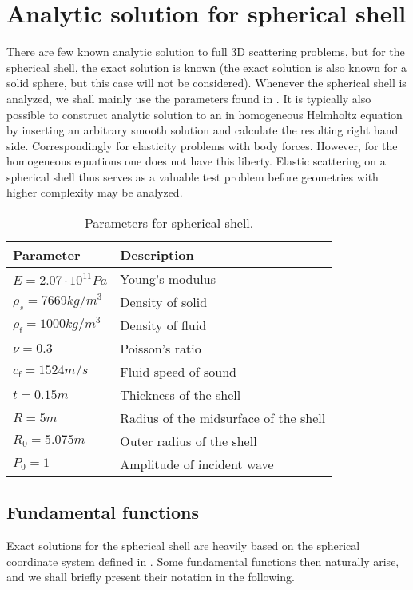 \section{Analytic solution for spherical shell}
\label{Sec2:analyticSolution}
There are few known analytic solution to full 3D scattering problems, but for the spherical shell, the exact solution is known (the exact solution is also known for a solid sphere, but this case will not be considered). Whenever the spherical shell is analyzed, we shall mainly use the parameters found in . It is typically also possible to construct analytic solution to an in homogeneous Helmholtz equation by inserting an arbitrary smooth solution and calculate the resulting right hand side. Correspondingly for elasticity problems with body forces. However, for the homogeneous equations one does not have this liberty. Elastic scattering on a spherical shell thus serves as a valuable test problem before geometries with higher complexity may be analyzed.
\begin{table}
	\centering
	\caption[Parameters for spherical shell]{Parameters for spherical shell.}
	\label{Tab2:sphericalShellParameters}
	\begin{tabular}{l l}
		\toprule
		Parameter & Description\\
		\midrule
		$E = 2.07\cdot 10^{11}\unit{Pa}$ & Young's modulus\\
		$\rho_s = 7669\unit{kg/m^3}$ & Density of solid\\
		$\rho_{\mathrm{f}} = 1000\unit{kg/m^3}$ & Density of fluid\\
		$\nu = 0.3$ & Poisson's ratio\\
		$c_{\mathrm{f}} = 1524\unit{m/s}$ & Fluid speed of sound\\
		$t = 0.15\unit{m}$ & Thickness of the shell\\
		$R = 5\unit{m}$ & Radius of the midsurface of the shell\\
		$R_0 = 5.075\unit{m}$ & Outer radius of the shell\\
		$P_0 = 1$ & Amplitude of incident wave\\
		\bottomrule
	\end{tabular}
\end{table}

\subsection{Fundamental functions}
Exact solutions for the spherical shell are heavily based on the spherical coordinate system defined in . Some fundamental functions then naturally arise, and we shall briefly present their notation in the following.

